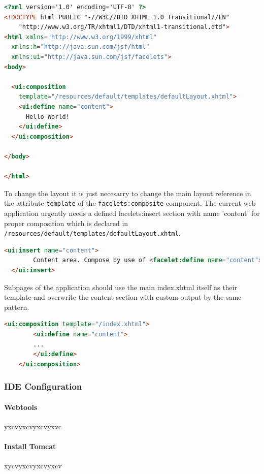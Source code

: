 \begin{lstlisting}[language=HTML]
<?xml version='1.0' encoding='UTF-8' ?>
<!DOCTYPE html PUBLIC "-//W3C//DTD XHTML 1.0 Transitional//EN" 
    "http://www.w3.org/TR/xhtml1/DTD/xhtml1-transitional.dtd">
<html xmlns="http://www.w3.org/1999/xhtml"
  xmlns:h="http://java.sun.com/jsf/html"
  xmlns:ui="http://java.sun.com/jsf/facelets">
<body>

  <ui:composition
    template="/resources/default/templates/defaultLayout.xhtml">
    <ui:define name="content">
      Hello World!
    </ui:define>
  </ui:composition>

</body>

</html>
\end{lstlisting}

To change the layout it is just necesarry to change the main layout reference in
the attribute \texttt{template} of the \texttt{facelets:composite} component.
The current web application urgently needs a defined facelets:insert section
with name 'content' for proper composition which is declared in
\texttt{/resources/default/templates/defaultLayout.xhtml}.

\begin{lstlisting}[language=HTML]
 <ui:insert name="content">
    	Content area. Compose by use of <facelet:define name="content">.
  </ui:insert>
\end{lstlisting}

Subpages of the application should use the main index.xhtml itself as
their template and overwrite the content section with custom output by the same
pattern.

\begin{lstlisting}[language=HTML] 
	<ui:composition template="/index.xhtml">
  		<ui:define name="content">
  		...
  		</ui:define>
 	</ui:composition>
\end{lstlisting}

\subsubsection{IDE Configuration}

\paragraph{Webtools}
yxcvyxcvyxcvyxvc
\paragraph{Install Tomcat}
xycvyxcvyxcvyxcv

